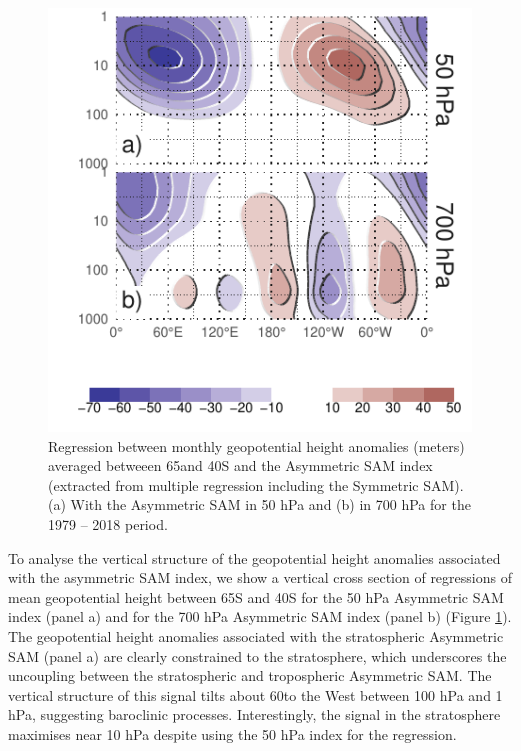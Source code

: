 \documentclass[]{ametsocV5}
\begin{document}
\begin{figure}
\includegraphics{vertical-regression-1} \caption[Regression between monthly geopotential height anomalies (meters) averaged betweeen 65\degree and 40\degree S and the Asymmetric SAM index (extracted from multiple regression including the Symmetric SAM)]{Regression between monthly geopotential height anomalies (meters) averaged betweeen 65\degree and 40\degree S and the Asymmetric SAM index (extracted from multiple regression including the Symmetric SAM). (a) With the Asymmetric SAM in 50 hPa and (b) in 700 hPa for the 1979 -- 2018 period.}\label{fig:vertical-regression}
\end{figure}

To analyse the vertical structure of the geopotential height anomalies associated with the asymmetric SAM index, we show a vertical cross section of regressions of mean geopotential height between 65\degree S and 40\degree S for the 50 hPa Asymmetric SAM index (panel a) and for the 700 hPa Asymmetric SAM index (panel b) (Figure \ref{fig:vertical-regression}). The geopotential height anomalies associated with the stratospheric Asymmetric SAM (panel a) are clearly constrained to the stratosphere, which underscores the uncoupling between the stratospheric and tropospheric Asymmetric SAM. The vertical structure of this signal tilts about 60\degree to the West between 100 hPa and 1 hPa, suggesting baroclinic processes. Interestingly, the signal in the stratosphere maximises near 10 hPa despite using the 50 hPa index for the regression.
\end{document}
